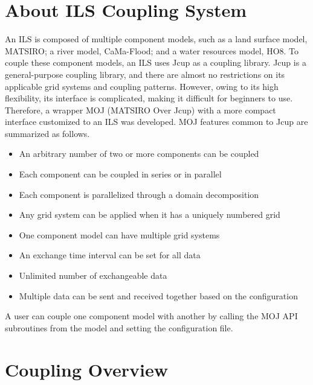 \documentclass[11pt,a4paper]{report}
\begin{document}
\section{About ILS Coupling System}
An ILS is composed of multiple component models, such as a land surface model, MATSIRO; a river model, CaMa-Flood; and a water resources model, HO8.
To couple these component models, an ILS uses Jcup as a coupling library.
Jcup is a general-purpose coupling library, and there are almost no restrictions on its applicable grid systems and coupling patterns.
However, owing to its high flexibility, its interface is complicated, making it difficult for beginners to use.
Therefore, a wrapper MOJ (MATSIRO Over Jcup) with a more compact interface customized to an ILS was developed.
 MOJ features common to Jcup are summarized as follows.

\begin{itemize}
\item{An arbitrary number of two or more components can be coupled}
\item{Each component can be coupled in series or in parallel}
\item{Each component is parallelized through a domain decomposition}
\item{Any grid system can be applied when it has a uniquely numbered grid}
\item{One component model can have multiple grid systems}
\item{An exchange time interval can be set for all data}
\item{Unlimited number of exchangeable data}
\item{Multiple data can be sent and received together based on the configuration}
\end{itemize}

A user can couple one component model with another by calling the MOJ API subroutines from the model and setting the configuration file.

\section{Coupling Overview}
\end{document}
